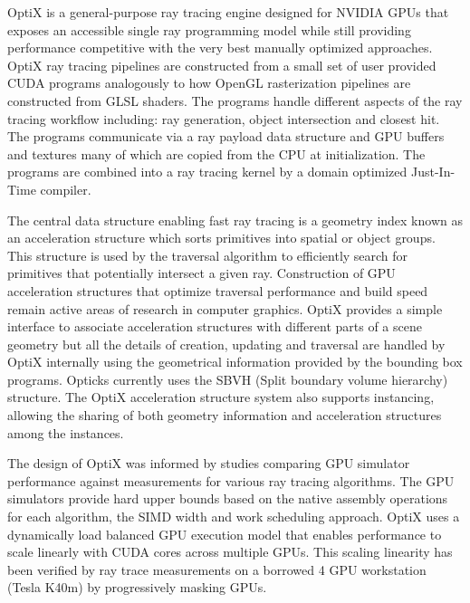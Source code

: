 \documentclass[a4paper]{jpconf}
\begin{document}
OptiX\cite{optixPaper} \cite{optixSite} is a general-purpose ray tracing engine 
designed for NVIDIA GPUs that exposes an accessible single ray programming model 
while still providing performance competitive with the very best   
manually optimized approaches\cite{understanding}\cite{understandingAddendum}.  
%
OptiX ray tracing pipelines are constructed from a small set of user 
provided CUDA programs analogously to how OpenGL rasterization pipelines are 
constructed from GLSL shaders. The programs handle different aspects of the ray 
tracing workflow including: ray generation, object intersection and closest hit.
The programs communicate via a ray payload data structure and GPU buffers and 
textures many of which are copied from the CPU at initialization.
The programs are combined into a ray tracing kernel by a domain optimized Just-In-Time compiler.

The central data structure enabling fast ray tracing is a geometry index
known as an acceleration structure which sorts primitives 
into spatial or object groups. This structure is used by the traversal 
algorithm to efficiently search for primitives that potentially intersect a
given ray. Construction of GPU acceleration structures that optimize traversal
performance and build speed remain active areas of research in computer graphics.
OptiX provides a simple interface to associate acceleration structures 
with different parts of a scene geometry but all the details of creation, updating 
and traversal are handled by OptiX internally using the geometrical information provided by the 
bounding box programs. Opticks currently uses the SBVH (Split boundary volume hierarchy) structure\cite{sbvh}.
The OptiX acceleration structure system also supports instancing, allowing 
the sharing of both geometry information and acceleration structures among the
instances.

The design of OptiX was informed by studies\cite{understanding}\cite{understandingAddendum}
comparing GPU simulator performance against measurements
for various ray tracing algorithms. The GPU simulators 
provide hard upper bounds based on the native assembly operations
for each algorithm, the SIMD width and work scheduling approach. 
OptiX uses a dynamically load balanced GPU execution model that enables
performance to scale linearly with CUDA cores across multiple GPUs. 
This scaling linearity has been verified by ray trace measurements on a 
borrowed 4 GPU workstation (Tesla K40m) by progressively masking GPUs.
\end{document}
